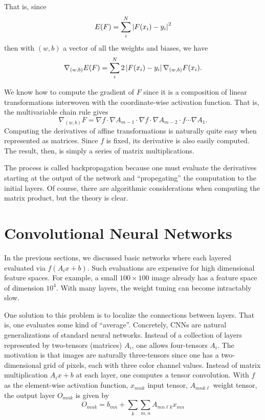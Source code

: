 \documentclass[12pt,letterpaper,boxed]{article}
\begin{document}
		That is, since
		\[
			E(F) = \sum_i^N \left| F(x_i) - y_i \right|^2
		\]
		then with $(w,b)$ a vector of all the weights and biases, we have
		\[
			\nabla_{(w, b)} E(F) = \sum_i^N 2 \left| F(x_i) - y_i \right| \nabla_{(w, b)} F(x_i).
		\]

		We know how to compute the gradient of $F$ since it is a composition of linear transformations interwoven with the coordinate-wise activation function. That is, the multivariable chain rule gives
		\[
			\nabla_{(w, b)} F = \nabla f \cdot \nabla A_{m - 1} \cdot \nabla f \cdot \nabla A_{m - 2} \cdot f \cdots \nabla A_1. 
		\]
		Computing the derivatives of affine transformations is naturally quite easy when represented as matrices. Since $f$ is fixed, its derivative is also easily computed. The result, then, is simply a series of matrix multiplications.

		The process is called backpropagation because one must evaluate the derivatives starting at the output of the network and ``propegating'' the computation to the initial layers. Of course, there are algorithmic considerations when computing the matrix product, but the theory is clear.

\section{Convolutional Neural Networks}
In the previous sections, we discussed basic networks where each layered evaluated via $f(A_i x + b)$. Such evaluations are expensive for high dimensional feature spaces. For example, a small $100\times100$ image already has a feature space of dimension $10^4$. With many layers, the weight tuning can become intractably slow. 

One solution to this problem is to localize the connections between layers. That is, one evaluates some kind of ``average''. Concretely, CNNs are natural generalizations of standard neural networks. Instead of a collection of layers represented by two-tensors (matrices) $A_i$, one allows four-tensors $A_i$. The motivation is that images are naturally three-tensors since one has a two-dimensional grid of pixels, each with three color channel values. Instead of matrix multiplication $A_i x + b$ at each layer, one computes a tensor convolution. With $f$ as the element-wise activation function, $x_{mnk}$ input tensor, $A_{mnk\ell}$ weight tensor, the output layer $O_{mnk}$ is given by
\[
	O_{mnk}  = b_{mn} + \sum_k \sum_{m,n} A_{mn \ell k} x_{mn}
\]

\end{document}
